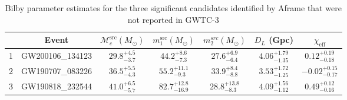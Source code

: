 \begin{table}[ht]
\centering
\caption{Bilby parameter estimates for the three significant candidates identified by Aframe that were not reported in GWTC-3}
\label{o3cat_tab:aframe-pe}
\begin{tabular}{!{\vrule width 1pt}lcccccc!{\vrule width 1pt}}
\toprule[1pt]
& Event & $\mathcal{M}_c^\mathrm{src} (M_\odot)$ & ${m}_1^\mathrm{src} (M_\odot)$ & ${m}_2^{src} (M_\odot)$ & $D_L$ (Gpc) & $\chi_\mathrm{eff}$ \\
 & GW200106\_134123 & ${29.8}_{-3.7}^{+4.5}$ & ${44.2}_{-7.3}^{+8.6}$ & ${27.6}_{-6.4}^{+6.9}$ & ${4.06}_{-1.35}^{+1.79}$ & ${0.12}_{-0.18}^{+0.19}$ \\
2 & GW190707\_083226 & ${36.5}_{-4.3}^{+5.5}$ & ${55.2}_{-9.3}^{+11.1}$ & ${33.9}_{-8.8}^{+8.4}$ & ${3.53}_{-1.25}^{+1.72}$ & ${-0.02}_{-0.17}^{+0.15}$ \\
3 & GW190818\_232544 & ${41.0}_{-5.7}^{+6.5}$ & ${82.7}_{-16.9}^{+12.8}$ & ${28.8}_{-8.3}^{+13.8}$ & ${4.09}_{-1.12}^{+1.56}$ & ${0.49}_{-0.16}^{+0.12}$ \\
\bottomrule[1pt]
\end{tabular}
\end{table}








